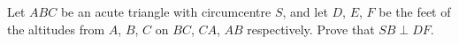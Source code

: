Let $ABC$ be an acute triangle with circumcentre $S$, and let $D$, $E$, $F$ be the feet of the altitudes from $A$, $B$, $C$ on $BC$, $CA$, $AB$ respectively. Prove that $SB\perp DF$.
